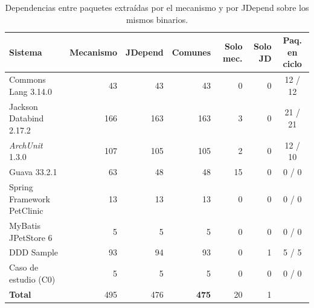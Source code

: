 \begin{table}[H]
\centering
\caption{Dependencias entre paquetes extraídas por el mecanismo y por JDepend sobre los mismos binarios.}
\label{tab:oraculo}
\footnotesize
\setlength{\tabcolsep}{4pt}
\begin{tabular}{lrrrrrc}
\toprule
\textbf{Sistema} & \textbf{Mecanismo} & \textbf{JDepend} & \textbf{Comunes} & \textbf{Solo mec.} & \textbf{Solo JD} & \textbf{Paq. en ciclo} \\
\midrule
Commons Lang 3.14.0 & 43 & 43 & 43 & 0 & 0 & 12 / 12 \\
Jackson Databind 2.17.2 & 166 & 163 & 163 & 3 & 0 & 21 / 21 \\
\textit{ArchUnit} 1.3.0 & 107 & 105 & 105 & 2 & 0 & 12 / 10 \\
Guava 33.2.1 & 63 & 48 & 48 & 15 & 0 & 0 / 0 \\
Spring Framework PetClinic & 13 & 13 & 13 & 0 & 0 & 0 / 0 \\
MyBatis JPetStore 6 & 5 & 5 & 5 & 0 & 0 & 0 / 0 \\
DDD Sample & 93 & 94 & 93 & 0 & 1 & 5 / 5 \\
Caso de estudio (C0) & 5 & 5 & 5 & 0 & 0 & 0 / 0 \\
\midrule
\textbf{Total} & 495 & 476 & \textbf{475} & 20 & 1 & \\
\bottomrule
\end{tabular}
\end{table}

